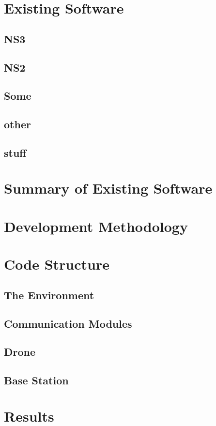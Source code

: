 \documentclass[12pt,a4paper,twoside]{report}
\begin{document}
	\section{Existing Software}
		\subsection{NS3}
		\subsection{NS2}
		\subsection{Some}
		\subsection{other}
		\subsection{stuff}
	\section{Summary of Existing Software}
	\section{Development Methodology}
	\section{Code Structure}
		\subsection{The Environment}
		\subsection{Communication Modules}
		\subsection{Drone}
		\subsection{Base Station}
	\section{Results}
\end{document}
